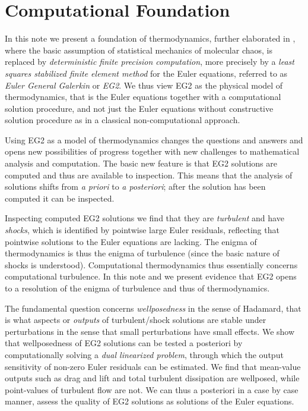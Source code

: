 \section{Computational Foundation}

In this note we present a foundation of thermodynamics, further
elaborated in \cite{Nazarov2009, HoffmanJohnson2007},
where the basic assumption of statistical mechanics of
molecular chaos, is replaced by
\emph{deterministic finite precision computation}, more precisely by
a \emph{least squares stabilized finite element method}
for the Euler equations, referred to
as \emph{Euler General Galerkin} or \emph{EG2}.
We thus view EG2 as the
physical model of thermodynamics, that is the Euler equations
together with a computational solution procedure, and not just
the Euler equations without constructive solution procedure
as in a classical non-computational approach.

Using EG2 as a model of thermodynamics changes the questions
and answers and opens new possibilities of progress together with
new challenges to mathematical analysis and computation.
The basic new feature is that EG2 solutions are computed and thus
are available to inspection. This means that the analysis of solutions
shifts from \emph{a priori} to \emph{a posteriori}; after the solution
has been computed it can be inspected.

Inspecting computed EG2 solutions we find that they are
\emph{turbulent} and have \emph{shocks}, which is identified by pointwise
large Euler residuals, reflecting that pointwise solutions
to the Euler equations are lacking. The enigma of thermodynamics
is thus the enigma of turbulence (since the basic nature of shocks is
understood). Computational thermodynamics thus essentially
concerns computational turbulence. In this note and \cite{HoffJohnson2007}
we present evidence that EG2 opens to a resolution
of the enigma of turbulence and thus of thermodynamics.


The fundamental question concerns \emph{wellposedness} in the sense
of Hadamard, that is what aspects or \emph{outputs} of
turbulent/shock solutions
are stable under perturbations in the sense that small perturbations
have small effects. We show that wellposedness of EG2 solutions
can be tested a posteriori by computationally solving a \emph{dual linearized
problem}, through which the output sensitivity of non-zero Euler residuals
can be estimated. We find that mean-value outputs such as drag and lift
and total turbulent dissipation are wellposed, while point-values
of turbulent flow are not. We can thus a posteriori in a case by case
manner, assess the quality of EG2 solutions as solutions of the Euler
equations.


